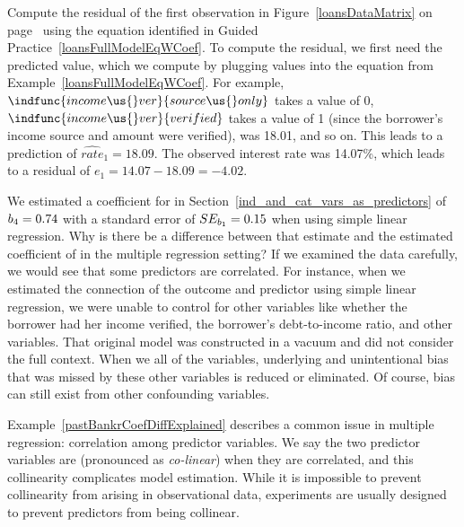 \begin{examplewrap}
\begin{nexample}{Compute the residual of the first observation
    in Figure~\ref{loansDataMatrix} on
    page~\pageref{loansDataMatrix} using the equation identified
    in Guided Practice~\ref{loansFullModelEqWCoef}.}
  To compute the residual, we first need the predicted value,
  which we compute by plugging values into the equation from
  Example~\ref{loansFullModelEqWCoef}.
  For example, $\indfunc{income\us{}ver}{source\us{}only}$
  takes a value of 0,
  $\indfunc{income\us{}ver}{verified}$ takes a value of 1
  (since the borrower's income source and amount were verified),
   was 18.01, and so on.
  This leads to a prediction of $\widehat{rate}_1 = 18.09$.
  The observed interest rate was 14.07\%, which leads to
  a residual of $e_1 = 14.07 - 18.09 = -4.02$.
\end{nexample}
\end{examplewrap}

\begin{examplewrap}
\begin{nexample}{We estimated a coefficient for
     in
    Section~\ref{ind_and_cat_vars_as_predictors}
    of $b_4 = 0.74{}$ with a standard error
    of $SE_{b_1} = 0.15{}$ when using simple
    linear regression.
    Why is there be a difference between that estimate
    and the estimated coefficient of \pastbankrFullCoef{}
    in the multiple regression setting?}
  \label{pastBankrCoefDiffExplained}%
  If we examined the data carefully, we would see that
  some predictors are correlated.
  For instance, when we estimated the connection of the
  outcome  and predictor
   using simple linear regression,
  we were unable to control for other variables like
  whether the borrower had her income verified,
  the borrower's debt-to-income ratio, and other variables.
  That original model was constructed in a vacuum and did
  not consider the full context.
  When we all of the variables, underlying and unintentional
  bias that was missed by these other variables is reduced
  or eliminated.
  Of course, bias can still exist from other confounding
  variables.
\end{nexample}
\end{examplewrap}

Example~\ref{pastBankrCoefDiffExplained} describes a common
issue in multiple regression: correlation among predictor
variables.
We say the two predictor variables are 
(pronounced as \emph{co-linear}) when they are correlated,
and this collinearity complicates model estimation.
While it is impossible to prevent collinearity from arising
in observational data, experiments are usually designed to
prevent predictors from being collinear.

